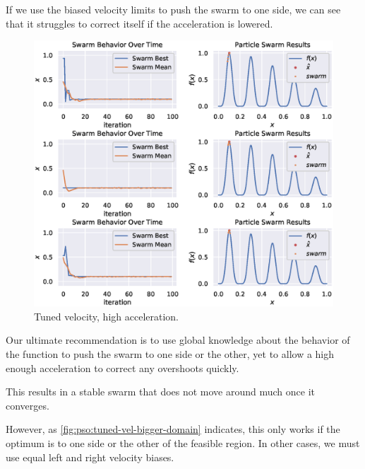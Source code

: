 \documentclass[12pt]{article}
\begin{document}
If we use the biased velocity limits to push the swarm to one side, we can see that it struggles to correct itself if the acceleration is lowered.

\begin{figure}[H]
    \centering
    \includegraphics[width=\textwidth]{figures/pso/pso-tuned-vel-high-accel.eps}
    \caption{Tuned velocity, high acceleration.}\label{fig:pso:tuned-vel-high-accel}
\end{figure}

Our ultimate recommendation is to use global knowledge about the behavior of the function to push the swarm to one side or the other, yet to allow a high enough acceleration to correct any overshoots quickly.

This results in a stable swarm that does not move around much once it converges.

However, as \autoref{fig:pso:tuned-vel-bigger-domain} indicates, this only works if the optimum is to one side or the other of the feasible region.
In other cases, we must use equal left and right velocity biases.
\end{document}
